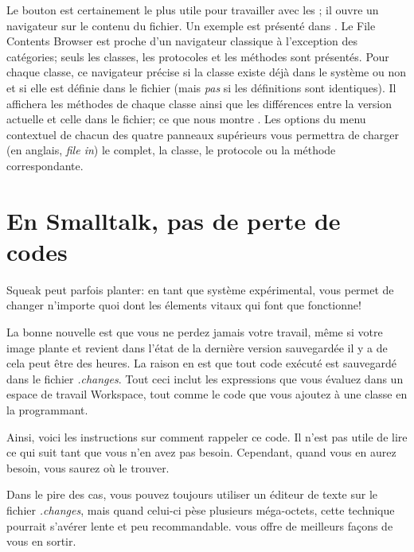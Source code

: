 \documentclass[a4paper,10pt,twoside]{book}
\begin{document}
Le bouton  est certainement le plus utile pour travailler avec les \changesets;
il ouvre un navigateur sur le contenu du fichier. Un exemple est pr\'esent\'e dans
.
Le File Contents Browser est proche d'un navigateur classique \`a l'exception
des cat\'egories; seuls les classes, les protocoles et les m\'ethodes sont pr\'esent\'es.
Pour chaque classe, ce navigateur pr\'ecise si la classe existe d\'ej\`a dans
le syst\`eme ou non et si elle est d\'efinie dans le fichier (mais \emph{pas} si
les d\'efinitions sont identiques).
Il affichera les m\'ethodes de chaque classe
ainsi que les diff\'erences entre la version actuelle et celle dans le fichier; ce que
nous montre .
Les options du menu contextuel de chacun des quatre panneaux sup\'erieurs vous
permettra de charger (en anglais, \emph{file in}) le \changeset complet, la classe, 
le protocole ou la m\'ethode correspondante.

\section{En Smalltalk, pas de perte de codes}
\label{sec:cantLoseCode} %

Squeak peut parfois planter: en tant que syst\`eme exp\'erimental, \sq vous permet
de changer n'importe quoi dont les \'elements vitaux qui font que \sq fonctionne!


La bonne nouvelle est que vous ne perdez jamais votre travail, m\^eme si votre 
image plante et revient dans l'\'etat de la derni\`ere version sauvegard\'ee il y 
a de cela peut \^etre des heures.
La raison en est que tout code ex\'ecut\'e est sauvegard\'e dans le fichier
\emph{.changes}.
Tout ceci inclut les expressions que vous \'evaluez dans un espace de travail Workspace,
tout comme le code que vous ajoutez \`a une classe en la programmant.

Ainsi, voici les instructions sur comment rappeler ce code.
Il n'est pas utile de lire ce qui suit tant que vous n'en avez pas besoin.
Cependant, quand vous en aurez besoin, vous saurez o\`u le trouver.

Dans le pire des cas, vous pouvez toujours utiliser un \'editeur de texte
sur le fichier \emph{.changes}, mais quand celui-ci p\`ese plusieurs m\'ega-octets,
cette technique pourrait s'av\'erer lente et peu recommandable.
\sq vous offre de meilleurs fa\c{c}ons 
de vous en sortir.
\end{document}
